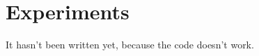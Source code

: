 
\section{Experiments}

    It hasn't been written yet, because the code doesn't work.

    \begin{comment}
    
    In our experiments\footnotemark we will apply our zero-order method from Subsection \ref{zo method} to Momentum-Based Frank-Wolfe algorithm from Subsection \ref{mbfw}, Frank-Wolfe algorithm from \cite{jaggi2013revisiting}, Stochastic Mirror Descent algorithm \cite{d2021stochastic} and Gradient Descend with Euclidean projection.

    \footnotetext{\href{https://github.com/Dd0-s/BachelorThesis/tree/main/code}{GitHub}}

    \begin{table}[!ht]
        \centering
        \begin{tabular}{|c|c|c|}

        \hline
            Algorithm & $N(L, \sigma^2, \varepsilon)$ & $T(L, \sigma^2, \varepsilon)$\\ \hline 
            
            MBFW \cite{akhtar2022zeroth} & $\mathcal{O}\left(\left[\frac{8 \sqrt{3} D + 41 L D^2}{\varepsilon}\right]^2\right)$ & $\mathcal{O}\left(\left[\frac{8 \sqrt{3} D + 41 L D^2}{\varepsilon}\right]^2\right)$\\ [0.1cm]\hline

            FW \cite{frank1956algorithm} & $\mathcal{O}\left(\frac{LD^2}{\varepsilon}\right)$ & $M_s\footnotemark \cdot \mathcal{O}\left(\frac{LD^2}{\varepsilon} \right)$\\ [0.2cm]\hline 
            
            SMD \cite{d2021stochastic} & $\mathcal{O}\left(\frac{L(B_{\psi}\footnotemark (x^*, x_1) + \sigma^2)}{\varepsilon}\right)$ & $\mathcal{O}\left(\frac{L(B_{\psi}(x^*, x_1) + \sigma^2)}{\varepsilon}
            \right)$\\ [0.15cm] \hline

            Projection \cite{frei2007geometry} & $\mathcal{O}\left(\frac{2 L (f(x^0) - f(x^*))}{\varepsilon}\right)$ & $P_s\footnotemark \cdot \mathcal{O}\left(\frac{2 L (f(x^0) - f(x^*))}{\varepsilon}\right)$\\ [0.2cm] \hline 
        

\end{comment}
